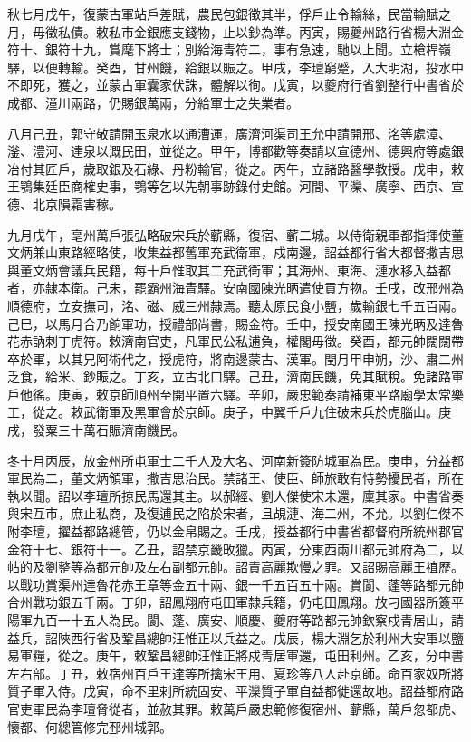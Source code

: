 \begin{pinyinscope}
 秋七月戊午，復蒙古軍站戶差賦，農民包銀徵其半，俘戶止令輸絲，民當輸賦之月，毋徵私債。敕私市金銀應支錢物，止以鈔為準。丙寅，賜夔州路行省楊大淵金符十、銀符十九，賞麾下將士；別給海青符二，事有急速，馳以上聞。立槍桿嶺驛，以便轉輸。癸酉，甘州饑，給銀以賑之。甲戌，李璮窮蹙，入大明湖，投水中不即死，獲之，並蒙古軍囊家伏誅，體解以徇。戊寅，以夔府行省劉整行中書省於成都、潼川兩路，仍賜銀萬兩，分給軍士之失業者。



 八月己丑，郭守敬請開玉泉水以通漕運，廣濟河渠司王允中請開邢、洺等處漳、滏、澧河、達泉以溉民田，並從之。甲午，博都歡等奏請以宣德州、德興府等處銀冶付其匠戶，歲取銀及石綠、丹粉輸官，從之。丙午，立諸路醫學教授。戊申，敕王鶚集廷臣商榷史事，鶚等乞以先朝事跡錄付史館。河間、平灤、廣寧、西京、宣德、北京隕霜害稼。



 九月戊午，亳州萬戶張弘略破宋兵於蘄縣，復宿、蘄二城。以侍衛親軍都指揮使董文炳兼山東路經略使，收集益都舊軍充武衛軍，戍南邊，詔益都行省大都督撒吉思與董文炳會議兵民籍，每十戶惟取其二充武衛軍；其海州、東海、漣水移入益都者，亦隸本衛。己未，罷霸州海青驛。安南國陳光昞遣使貢方物。壬戌，改邢州為順德府，立安撫司，洺、磁、威三州隸焉。聽太原民食小鹽，歲輸銀七千五百兩。己巳，以馬月合乃餉軍功，授禮部尚書，賜金符。壬申，授安南國王陳光昞及達魯花赤訥剌丁虎符。敕濟南官吏，凡軍民公私逋負，權閣毋徵。癸酉，都元帥闊闊帶卒於軍，以其兄阿術代之，授虎符，將南邊蒙古、漢軍。閏月甲申朔，沙、肅二州乏食，給米、鈔賑之。丁亥，立古北口驛。己丑，濟南民饑，免其賦稅。免諸路軍戶他徭。庚寅，敕京師順州至開平置六驛。辛卯，嚴忠範奏請補東平路廟學太常樂工，從之。敕武衛軍及黑軍會於京師。庚子，中翼千戶九住破宋兵於虎腦山。庚戌，發粟三十萬石賑濟南饑民。



 冬十月丙辰，放金州所屯軍士二千人及大名、河南新簽防城軍為民。庚申，分益都軍民為二，董文炳領軍，撒吉思治民。禁諸王、使臣、師旅敢有恃勢擾民者，所在執以聞。詔以李璮所掠民馬還其主。以郝經、劉人傑使宋未還，廩其家。中書省奏與宋互市，庶止私商，及復逋民之陷於宋者，且覘漣、海二州，不允。以劉仁傑不附李璮，擢益都路總管，仍以金帛賜之。壬戌，授益都行中書省都督府所統州郡官金符十七、銀符十一。乙丑，詔禁京畿畋獵。丙寅，分東西兩川都元帥府為二，以帖的及劉整等為都元帥及左右副都元帥。詔責高麗欺慢之罪。又詔賜高麗王禃歷。以戰功賞渠州達魯花赤王章等金五十兩、銀一千五百五十兩。賞閬、蓬等路都元帥合州戰功銀五千兩。丁卯，詔鳳翔府屯田軍隸兵籍，仍屯田鳳翔。放刁國器所簽平陽軍九百一十五人為民。閬、蓬、廣安、順慶、夔府等路都元帥欽察戍青居山，請益兵，詔陜西行省及鞏昌總帥汪惟正以兵益之。戊辰，楊大淵乞於利州大安軍以鹽易軍糧，從之。庚午，敕鞏昌總帥汪惟正將戍青居軍還，屯田利州。乙亥，分中書左右部。丁丑，敕宿州百戶王達等所擒宋王用、夏珍等八人赴京師。命百家奴所將質子軍入侍。戊寅，命不里剌所統固安、平灤質子軍自益都徙還故地。詔益都府路官吏軍民為李璮脅從者，並赦其罪。敕萬戶嚴忠範修復宿州、蘄縣，萬戶忽都虎、懷都、何總管修完邳州城郭。




\end{pinyinscope}
